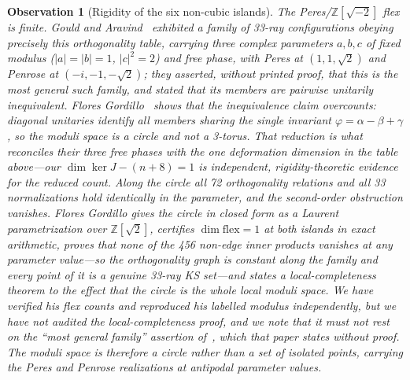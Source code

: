 \documentclass[12pt,a4paper]{article}
\newtheorem{observation}[theorem]{Observation}
\newcommand{\Z}{\mathbb{Z}}
\begin{document}
\begin{observation}[Rigidity of the six non-cubic islands]
The Peres/\mbox{$\Z[\sqrt{-2}]$} flex is \emph{finite}.  Gould and Aravind~\cite{GouldAravind2010} exhibited a family of 33-ray configurations obeying precisely this orthogonality table, carrying three complex parameters $a,b,c$ of fixed modulus ($|a| = |b| = 1$, $|c|^2 = 2$) and free phase, with Peres at $(1,1,\sqrt{2})$ and Penrose at $(-i,-1,-\sqrt{2})$; they asserted, without printed proof, that this is the most general such family, and stated that its members are pairwise unitarily inequivalent.  Flores Gordillo~\cite[Corollary~3.2]{FloresGordillo2026} shows that the inequivalence claim overcounts: diagonal unitaries identify all members sharing the single invariant $\varphi = \alpha - \beta + \gamma$, so the moduli space is a circle and not a 3-torus.  That reduction is what reconciles their three free phases with the one deformation dimension in the table above---our $\dim\ker J - (n{+}8) = 1$ is independent, rigidity-theoretic evidence for the reduced count.  Along the circle all 72 orthogonality relations and all 33 normalizations hold identically in the parameter, and the second-order obstruction vanishes.  Flores Gordillo gives the circle in closed form as a Laurent parametrization over $\Z[\sqrt{2}]$, certifies $\dim\mathrm{flex} = 1$ at both islands in exact arithmetic, proves that none of the 456 non-edge inner products vanishes at any parameter value---so the orthogonality graph is constant along the family and every point of it is a genuine 33-ray KS set---and states a local-completeness theorem to the effect that the circle is the whole local moduli space.  We have verified his flex counts and reproduced his labelled modulus independently, but we have not audited the local-completeness proof, and we note that it must not rest on the ``most general family'' assertion of~\cite{GouldAravind2010}, which that paper states without proof.  The moduli space is therefore a circle rather than a set of isolated points, carrying the Peres and Penrose realizations at antipodal parameter values.


\end{observation}
\end{document}
